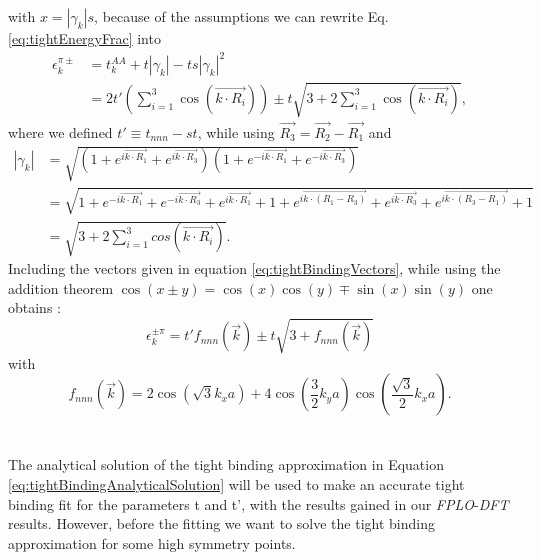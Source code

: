		with $x = |\gamma_k|s$, because of the assumptions we can rewrite Eq. \ref{eq:tightEnergyFrac} into 
		\begin{equation}
			\label{eq:tightBindingAnalyticalSolution}
			\begin{split}
				\epsilon_k^{\pi \pm} &= t_k^{AA} + t|\gamma_k| - ts|\gamma_k|^2 \\
				&= 2t' ( \sum_{i=1}^{3} \cos(\vec{k \cdot R_i})) \pm t\sqrt{3 + 2\sum_{i=1}^{3} \cos(\vec{k \cdot R_i})},
			\end{split}
		\end{equation}
		where we defined $t' \equiv t_{nnn} - st$, while using $\vec{R_3} = \vec{R_2} - \vec{R_1}$ and
		\begin{equation}
			\begin{split}
					|\gamma_k| &= \sqrt{(1 + e^{i\vec{k \cdot R_1}} + e^{i\vec{k \cdot R_3}})(1 + e^{-i\vec{k \cdot R_1}} + e^{-i\vec{k \cdot R_3}})} \\
					&= \sqrt{1 + e^{-i\vec{k \cdot R_1}} + e^{-i\vec{k \cdot R_3}} + e^{i \vec{k \cdot R_1}} + 1 + e^{i \vec{ k \cdot (R_1 - R_3)}} + e^{i\vec{k \cdot R_3}} + e^{i \vec{k \cdot (R_3 - R_1)}} + 1} \\
					&= \sqrt{3 + 2\sum_{i=1}^{3} cos(\vec{k \cdot R_i})}.
			\end{split}
		\end{equation}
		Including the vectors given in equation \ref{eq:tightBindingVectors}, while using the addition theorem $\cos(x \pm y) = \cos(x)\cos(y) \mp \sin(x)\sin(y)$ one obtains :
		\begin{equation}
			\epsilon_k^{\pm \pi} = t'f_{nnn}(\vec k) \pm t\sqrt{3 + f_{nnn}(\vec k)}
		\end{equation}
		with
		\begin{equation}
			f_{nnn}(\vec k) = 2\cos(\sqrt{3} k_x a ) + 4\cos(\frac{3}{2} k_y a)\cos(\frac{\sqrt{3}}{2}k_x a).
		\end{equation} \\\\
		The analytical solution of the tight binding approximation in Equation \ref{eq:tightBindingAnalyticalSolution} will be used to make an accurate tight binding fit for the parameters t and t', with the results gained in our \textit{FPLO}-\textit{DFT} results. However, before the fitting we want to solve the tight binding approximation for some high symmetry points. \\

